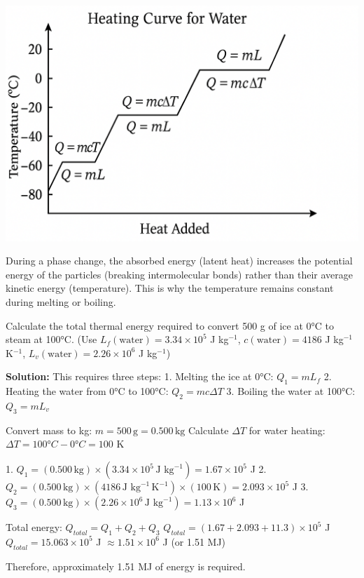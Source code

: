 \begin{marginfigure}[-20pt] %
\includegraphics[width=\linewidth]{water_heating.png} %
\caption{Heating curve for water. Sloped sections represent temperature increases (Q=mc\textDelta T applies). Flat sections represent phase changes at constant temperature (Q=mL applies): melting at 0°C and boiling at 100°C.}
\label{fig:heating_curve}
\end{marginfigure}

During a phase change, the absorbed energy (latent heat) increases the potential energy of the particles (breaking intermolecular bonds) rather than their average kinetic energy (temperature). This is why the temperature remains constant during melting or boiling.

\begin{example}
Calculate the total thermal energy required to convert 500 g of ice at 0°C to steam at 100°C.
(Use \(L_f(\text{water}) = 3.34 \times 10^5\) J kg\(^{-1}\), \(c(\text{water}) = 4186\) J kg\(^{-1}\) K\(^{-1}\), \(L_v(\text{water}) = 2.26 \times 10^6\) J kg\(^{-1}\))

\textbf{Solution:}
This requires three steps:
1.  Melting the ice at 0°C: \(Q_1 = mL_f\)
2.  Heating the water from 0°C to 100°C: \(Q_2 = mc\Delta T\)
3.  Boiling the water at 100°C: \(Q_3 = mL_v\)

Convert mass to kg: \(m = 500\,\text{g} = 0.500\,\text{kg}\)
Calculate \(\Delta T\) for water heating: \(\Delta T = 100°C - 0°C = 100\) K

1.  \(Q_1 = (0.500\,\text{kg}) \times (3.34 \times 10^5\,\text{J kg}^{-1}) = 1.67 \times 10^5\) J
2.  \(Q_2 = (0.500\,\text{kg}) \times (4186\,\text{J kg}^{-1}\,\text{K}^{-1}) \times (100\,\text{K}) = 2.093 \times 10^5\) J
3.  \(Q_3 = (0.500\,\text{kg}) \times (2.26 \times 10^6\,\text{J kg}^{-1}) = 1.13 \times 10^6\) J

Total energy: \(Q_{total} = Q_1 + Q_2 + Q_3\)
\(Q_{total} = (1.67 + 2.093 + 11.3) \times 10^5\) J
\(Q_{total} = 15.063 \times 10^5\) J \(\approx 1.51 \times 10^6\) J (or 1.51 MJ)

Therefore, approximately 1.51 MJ of energy is required.
\end{example}

